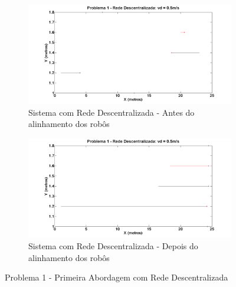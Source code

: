 \begin{figure}[!htb]
	\centering
	\begin{subfigure}{.5\textwidth}
		\centering
		\includegraphics[width=.9\linewidth]{./04-figuras/Simulacoes/Problema1-Abordagem1/P1_A1_Desc_Inicio}
		\caption{Sistema com Rede Descentralizada - Antes do alinhamento dos robôs}
		\label{fig:P1DIni}
	\end{subfigure}%
	\begin{subfigure}{.5\textwidth}
		\centering
		\includegraphics[width=.9\linewidth]{./04-figuras/Simulacoes/Problema1-Abordagem1/P1_A1_Desc_Fim}
		\caption{Sistema com Rede Descentralizada - Depois do alinhamento dos robôs}
		\label{fig:P1DFim}
	\end{subfigure}
	\caption{Problema 1 - Primeira Abordagem com Rede Descentralizada}
	\label{fig:sP1Desc}
\end{figure}

